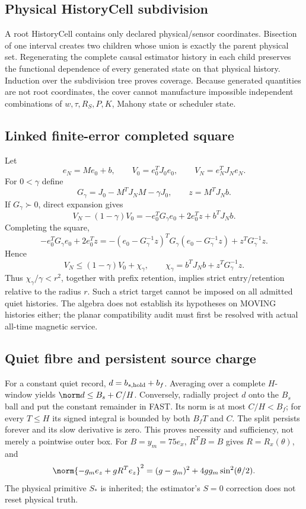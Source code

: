 \subsection{Physical HistoryCell subdivision}
A root HistoryCell contains only declared physical/sensor coordinates. Bisection of one interval creates two children whose union is exactly the parent physical set. Regenerating the complete causal estimator history in each child preserves the functional dependence of every generated state on that physical history. Induction over the subdivision tree proves coverage. Because generated quantities are not root coordinates, the cover cannot manufacture impossible independent combinations of \(w,\tau,R_S,P,K\), Mahony state or scheduler state.

\subsection{Linked finite-error completed square}
Let
\[
e_N=Me_0+b,\qquad V_0=e_0^TJ_0e_0,\qquad V_N=e_N^TJ_Ne_N.
\]
For \(0<\gamma\) define
\[
G_\gamma=J_0-M^TJ_NM-\gamma J_0,\qquad z=M^TJ_Nb.
\]
If \(G_\gamma\succ0\), direct expansion gives
\[
V_N-(1-\gamma)V_0
=-e_0^TG_\gamma e_0+2e_0^Tz+b^TJ_Nb.
\]
Completing the square,
\[
-e_0^TG_\gamma e_0+2e_0^Tz
=-(e_0-G_\gamma^{-1}z)^TG_\gamma(e_0-G_\gamma^{-1}z)
+z^TG_\gamma^{-1}z.
\]
Hence
\[
V_N\le(1-\gamma)V_0+\chi_\gamma,\qquad
\chi_\gamma=b^TJ_Nb+z^TG_\gamma^{-1}z.
\]
Thus \(\chi_\gamma/\gamma<r^2\), together with prefix retention, implies strict entry/retention relative to the radius \(r\). Such a strict target cannot be imposed on all admitted quiet histories. The algebra does not establish its hypotheses on MOVING histories either; the planar compatibility audit must first be resolved with actual all-time magnetic service.


\subsection{Quiet fibre and persistent source charge}
For a constant quiet record, \(d=b_{s,\rm hold}+b_f\). Averaging over a complete
\(H\)-window yields \(\norm d\le B_s+C/H\). Conversely, radially project
\(d\) onto the \(B_s\) ball and put the constant remainder in FAST. Its norm
is at most \(C/H<B_f\); for every \(T\le H\) its signed integral is bounded
by both \(B_fT\) and \(C\). The split persists forever and its slow derivative
is zero. This proves necessity and sufficiency, not merely a pointwise outer box.
For \(B=y_m=75e_x\), \(R^TB=B\) gives \(R=R_x(\theta)\), and
\[
\norm{-g_me_z+gR^Te_z}^2
=(g-g_m)^2+4gg_m\sin^2(\theta/2).
\]
The physical primitive \(S_*\) is inherited; the estimator's \(S=0\) correction
does not reset physical truth.

